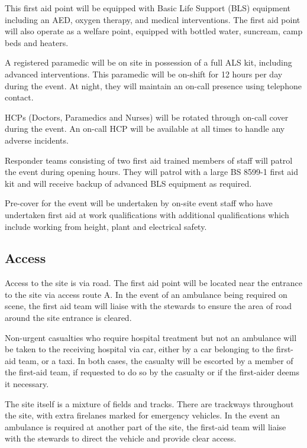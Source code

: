 This first aid point will be equipped with Basic Life Support (BLS) equipment including
an AED, oxygen therapy, and medical interventions. The first aid point will also operate as
a welfare point, equipped with bottled water, suncream, camp beds and heaters.

A registered paramedic will be on site in possession of a full ALS kit, including advanced
interventions. This paramedic will be on-shift for 12 hours per day during the event. At
night, they will maintain an on-call presence using telephone contact.

HCPs (Doctors, Paramedics and Nurses) will be rotated through on-call cover during the
event. An on-call HCP will be available at all times to handle any adverse incidents.

Responder teams consisting of two first aid trained members of staff will patrol the event
during opening hours. They will patrol with a large BS 8599-1 first aid kit and will receive
backup of advanced BLS equipment as required.

Pre-cover for the event will be undertaken by on-site event staff who have undertaken first aid
at work qualifications with additional qualifications which include working from height, plant
and electrical safety.

\subsection{Access}

Access to the site is via road. The first aid point will be located near the
entrance to the site via access route A. In the event of an ambulance being
required on scene, the first aid team will liaise with the stewards to ensure
the area of road around the site entrance is cleared.

Non-urgent casualties who require hospital treatment but not an ambulance will
be taken to the receiving hospital via car, either by a car belonging to the
first-aid team, or a taxi. In both cases, the casualty will be escorted by a
member of the first-aid team, if requested to do so by the casualty or if the
first-aider deems it necessary.

The site itself is a mixture of fields and tracks. There are
trackways throughout the site, with extra firelanes marked for emergency
vehicles. In the event an ambulance is required at another part of the site,
the first-aid team will liaise with the stewards to direct the vehicle and
provide clear access.

